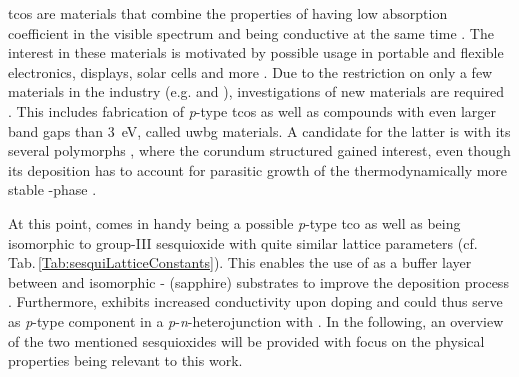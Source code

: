 \glspl{tco} are materials that combine the properties of having low absorption coefficient in the visible spectrum and being conductive at the same time
    \cite{kehoe2016}.
The interest in these materials is motivated by possible usage in portable and flexible electronics, displays, solar cells and more
    \cite{ginley2011}.
Due to the restriction on only a few materials in the industry (e.g.  and ), investigations of new materials are required
    \cite{ginley2011}.
This includes fabrication of \textit{p}-type \glspl{tco} as well as compounds with even larger band gaps than \qty{3}{eV}, called \gls{uwbg} materials.
A candidate for the latter is  with its several polymorphs
    \cite{hassa2021a},
where the corundum structured \agao{} gained interest, even though its deposition has to account for parasitic growth of the thermodynamically more stable \textbeta-phase
    \cite{petersen2023}.

At this point,  comes in handy being a possible \textit{p}-type \gls{tco} as well as being isomorphic to group-III sesquioxide \agao{} with quite similar lattice parameters (cf. Tab.\,\ref{Tab:sesquiLatticeConstants}).
This enables the use of  as a buffer layer between \agao{} and isomorphic \textalpha- (sapphire) substrates to improve the deposition process
    \cite{stepanov2021}.
Furthermore,  exhibits increased conductivity upon doping
    \cite{uekawa1996}
and could thus serve as \textit{p}-type component in a \textit{p}-\textit{n}-heterojunction with \agao{}.
In the following, an overview of the two mentioned sesquioxides will be provided with focus on the physical properties being relevant to this work.